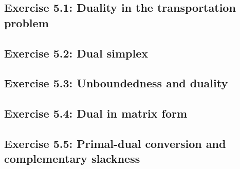 \subsection*{Exercise 5.1: Duality in the transportation problem}


\subsection*{Exercise 5.2: Dual simplex}


\subsection*{Exercise 5.3: Unboundedness and duality}


\subsection*{Exercise 5.4: Dual in matrix form}


\subsection*{Exercise 5.5: Primal-dual conversion and complementary slackness}






